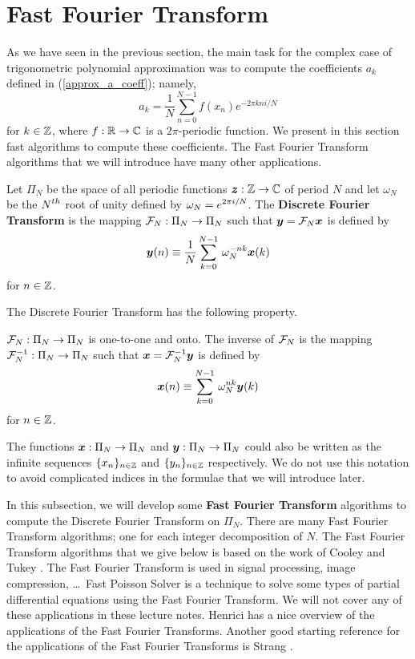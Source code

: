 \section{Fast Fourier Transform}

As we have seen in the previous section, the main task for the
complex case of trigonometric polynomial approximation was to compute
the coefficients $a_k$ defined in (\ref{approx_a_coeff}); namely,
\[
  a_k = \frac{1}{N} \sum_{n=0}^{N-1} f(x_n) e^{-2\pi k n i/N}
\]
for $k\in \mathbb{Z}$, where $f:\mathbb{R} \to \mathbb{C}$ is a $2\pi$-periodic function.
We present in this section fast algorithms to compute these coefficients.
The Fast Fourier Transform algorithms that we will introduce have many
other applications.

\begin{defn}
Let $\Pi_N$ be the space of all periodic functions
$\bm{z}:\mathbb{Z} \rightarrow \mathbb{C}$
of period $N$ and let $\omega_N$ be the $\displaystyle N^{th}$ root of
unity defined by $\displaystyle \omega_N = e^{2\pi i/N}$.  The
{\bfseries Discrete Fourier Transform}
is the mapping $\mathcal{F}_N: \Pi_N \rightarrow \Pi_N$ such that
$\bm{y} = \mathcal{F}_N \bm{x}$ is defined by
\[
\bm{y}(n) \equiv \frac{1}{N} \sum_{k=0}^{N-1} \, \omega_N^{-nk}
\bm{x}(k)
\]
for $n \in \mathbb{Z}$.
\end{defn}

The Discrete Fourier Transform has the following property.

\begin{prop}
$\mathcal{F}_N:\Pi_N \rightarrow \Pi_N$ is one-to-one and onto.  The inverse
of $\mathcal{F}_N$ is the mapping
$\displaystyle \mathcal{F}_N^{-1}: \Pi_N \rightarrow \Pi_N$ such
that $\displaystyle \bm{x} = \mathcal{F}_N^{-1} \bm{y}$ is defined by
\[
\bm{x}(n) \equiv \sum_{k=0}^{N-1} \, \omega_N^{nk} \bm{y}(k)
\]
for $n \in \mathbb{Z}$.
\end{prop}

The functions $\bm{x}:\Pi_N\rightarrow \Pi_N$ and
$\bm{y}: \Pi_N\rightarrow \Pi_N$ could also be written as
the infinite sequences $\displaystyle \{x_n\}_{n\in\mathbb{Z}}$ and
$\displaystyle \{y_n\}_{n\in\mathbb{Z}}$ respectively.  We do not use this
notation to avoid complicated indices in the formulae that we will
introduce later.

In this subsection, we will develop some
{\bfseries Fast Fourier Transform}
algorithms to compute the Discrete
Fourier Transform on $\Pi_N$.  There are many Fast Fourier Transform
algorithms; one for each integer decomposition of $N$.  The Fast
Fourier Transform algorithms that we give below is based on the
work of Cooley and Tukey \cite{CT}.  The Fast Fourier Transform is
used in signal processing, image compression, \ldots\  Fast Poisson
Solver is a technique to solve some types of partial differential
equations using the Fast Fourier Transform.  We will not cover any of
these applications in these lecture notes.   Henrici \cite{He} has a nice
overview of the applications of the Fast Fourier Transforms.  Another good
starting reference for the applications of the Fast Fourier Transforms
is Strang \cite{St}.


